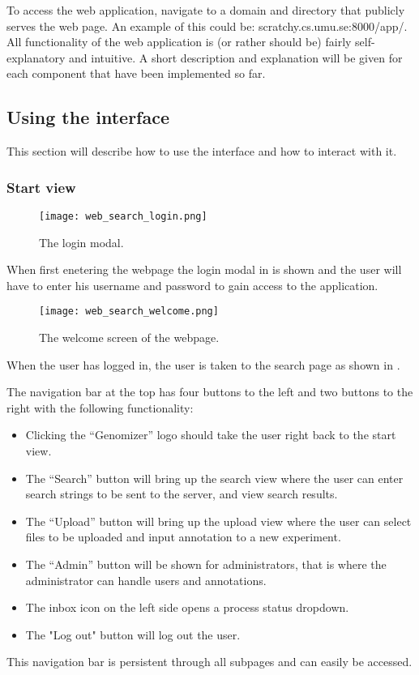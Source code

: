 To access the web application, navigate to a domain and directory that publicly serves the web page. An example of this could be: scratchy.cs.umu.se:8000/app/.
All functionality of the web application is (or rather should be) fairly self-explanatory and intuitive. A short description and explanation will be given for each component that have been implemented so far.
\subsection{Using the interface}
This section will describe how to use the interface and how to interact with it.
\subsubsection{Start view}
\begin{figure}[h]
\centering
\texttt{[image: web\_search\_login.png]}
\caption{\label{fig:web_search_login} The login modal.}
\end{figure}
When first enetering the webpage the login modal in  is shown and the user will have to enter his username and password to gain access to the application.

\begin{figure}[h]
\centering
\texttt{[image: web\_search\_welcome.png]}
\caption{\label{fig:web_search_welcome} The welcome screen of the webpage.}
\end{figure}

When the user has logged in, the user is taken to the search page as shown in .

The navigation bar at the top has four buttons to the left and two buttons to the right with the following functionality:
\begin{itemize}
	\item Clicking the “Genomizer” logo should take the user right back to the start view.
	\item The “Search” button will bring up the search view where the user can enter search strings to be sent to the server, and view search results.
	\item The “Upload” button will bring up the upload view where the user can select files to be uploaded and input annotation to a new experiment.
	\item The “Admin” button will be shown for administrators, that is where the administrator can handle users and annotations.
    \item The inbox icon on the left side opens a process status dropdown.
    \item The "Log out" button will log out the user.
\end{itemize}
This navigation bar is persistent through all subpages and can easily be accessed.

